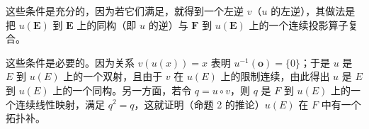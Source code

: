 这些条件是充分的，因为若它们满足，就得到一个左逆 \(v\)（\(u\) 的左逆），其做法是把 \(u(\mathbf{E})\) 到 \(\mathbf{E}\) 上的同构（即 \(u\) 的逆）与 \(\mathbf{F}\) 到 \(u(\mathbf{E})\) 上的一个连续投影算子复合。

这些条件是必要的。因为关系 \(v(u(x)) = x\) 表明 \(u^{-1}(\mathbf{o}) = \{0\}\)；于是 \(u\) 是 \(E\) 到 \(u(E)\) 上的一个双射，且由于 \(v\) 在 \(u(E)\) 上的限制连续，由此得出 \(u\) 是 \(E\) 到 \(u(E)\) 上的一个同构。另一方面，若令 \(q = u \circ v\)，则 \(q\) 是 \(F\) 到 \(u(E)\) 上的一个连续线性映射，满足 \(q^2 = q\)，这就证明（命题 2 的推论）\(u(E)\) 在 \(F\) 中有一个拓扑补。

